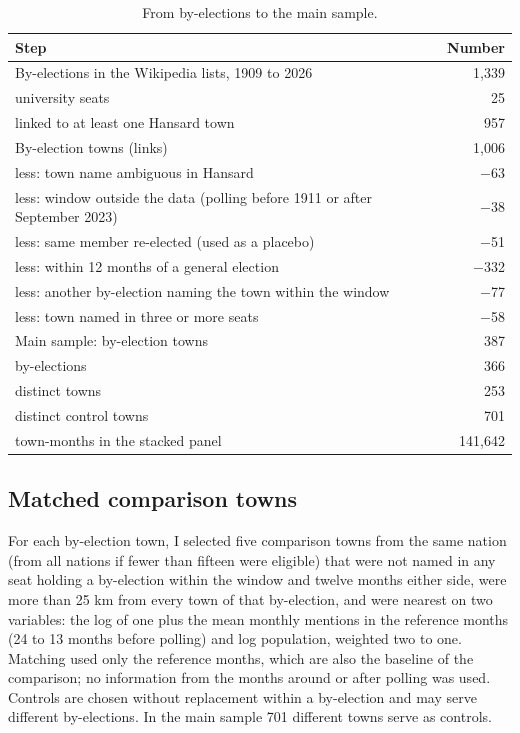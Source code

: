 \documentclass[11pt,a4paper]{article}
\begin{document}
\begin{table}[tbp]\centering\small\caption{From by-elections to the main sample.}\label{tab:flow}\begin{tabular}{lr}\toprule Step & Number\\\midrule
By-elections in the Wikipedia lists, 1909 to 2026 & 1,339\\
\quad university seats & 25\\
\quad linked to at least one Hansard town & 957\\
By-election towns (links) & 1,006\\
\quad less: town name ambiguous in Hansard & $-$63\\
\quad less: window outside the data (polling before 1911 or after September 2023) & $-$38\\
\quad less: same member re-elected (used as a placebo) & $-$51\\
\quad less: within 12 months of a general election & $-$332\\
\quad less: another by-election naming the town within the window & $-$77\\
\quad less: town named in three or more seats & $-$58\\\midrule
Main sample: by-election towns & 387\\
\quad by-elections & 366\\
\quad distinct towns & 253\\
\quad distinct control towns & 701\\
\quad town-months in the stacked panel & 141,642\\\bottomrule\end{tabular}\end{table}

\subsection{Matched comparison towns}
For each by-election town, I selected five comparison towns from the same nation (from all nations if fewer than fifteen were eligible) that were not named in any seat holding a by-election within the window and twelve months either side, were more than 25 km from every town of that by-election, and were nearest on two variables: the log of one plus the mean monthly mentions in the reference months (24 to 13 months before polling) and log population, weighted two to one. Matching used only the reference months, which are also the baseline of the comparison; no information from the months around or after polling was used. Controls are chosen without replacement within a by-election and may serve different by-elections. In the main sample 701 different towns serve as controls.
\end{document}
